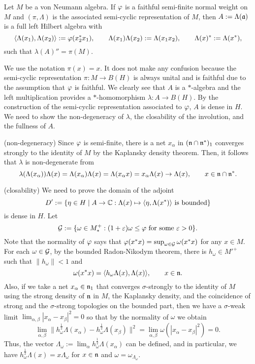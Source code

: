 \documentclass{../../small}
\begin{document}
\begin{thm}
Let $M$ be a von Neumann algebra.
If $\varphi$ is a faithful semi-finite normal weight on $M$ and $(\pi,\Lambda)$ is the associated semi-cyclic representation of $M$, then $A:=\Lambda(\mathfrak{a})$ is a full left Hilbert algebra with
\[\langle\Lambda(x_1),\Lambda(x_2)\rangle:=\varphi(x_2^*x_1),\qquad \Lambda(x_1)\Lambda(x_2):=\Lambda(x_1x_2),\qquad\Lambda(x)^*:=\Lambda(x^*),\]
such that $\lambda(A)''=\pi(M)$.
\end{thm}
\begin{pf}
We use the notation $\pi(x)=x$.
It does not make any confusion because the semi-cyclic representation $\pi:M\to B(H)$ is always unital and is faithful due to the assumption that $\varphi$ is faithful.
We clearly see that $A$ is a $*$-algebra and the left multiplication provides a $*$-homomorphism $\lambda:A\to B(H)$.
By the construction of the semi-cyclic representation associated to $\varphi$, $A$ is dense in $H$.
We need to show the non-degeneracy of $\lambda$, the closability of the involution, and the fullness of $A$.

(non-degeneracy)
Since $\varphi$ is semi-finite, there is a net $x_\alpha$ in $(\mathfrak{n}\cap\mathfrak{n}^*)_1$ converges strongly to the identity of $M$ by the Kaplansky density theorem.
Then, it follows that $\lambda$ is non-degenerate from
\[\lambda(\Lambda(x_\alpha))\Lambda(x)=\Lambda(x_\alpha)\Lambda(x)=\Lambda(x_\alpha x)=x_\alpha\Lambda(x)\to\Lambda(x),\qquad x\in\mathfrak{n}\cap\mathfrak{n}^*.\]

(closability)
We need to prove the domain of the adjoint
\[D':=\{\eta\in H\mid A\to\mathbb{C}:\Lambda(x)\mapsto\langle\eta,\Lambda(x^*)\rangle\text{ is bounded}\}\]
is dense in $H$.
Let
\[\mathcal{G}:=\{\omega\in M_*^+:(1+\varepsilon)\omega\le\varphi\text{ for some }\varepsilon>0\}.\]
Note that the normality of $\varphi$ says that $\varphi(x^*x)=\sup_{\omega\in\mathcal{G}}\omega(x^*x)$ for any $x\in M$.
For each $\omega\in\mathcal{G}$, by the bounded Radon-Nikodym theorem, there is $h_\omega\in M'^+$ such that $\|h_\omega\|<1$ and
\[\omega(x^*x)=\langle h_\omega\Lambda(x),\Lambda(x)\rangle,\qquad x\in\mathfrak{n}.\]
Also, if we take a net $x_\alpha\in\mathfrak{n}_1$ that converges $\sigma$-strongly to the identity of $M$ using the strong density of $\mathfrak{n}$ in $M$, the Kaplansky density, and the coincidence of strong and the $\sigma$-strong topologies on the bounded part, then we have a $\sigma$-weak limit $\lim_{\alpha,\beta}|x_\alpha-x_\beta|^2=0$ so that by the normality of $\omega$ we obtain
\[\lim_{\alpha,\beta}\|h_\omega^{\frac12}\Lambda(x_\alpha)-h_\omega^{\frac12}\Lambda(x_\beta)\|^2=\lim_{\alpha,\beta}\omega(|x_\alpha-x_\beta|^2)=0.\]
Thus, the vector $\Lambda_\omega:=\lim_\alpha h_\omega^{\frac12}\Lambda(x_\alpha)$ can be defined, and in particular, we have $h_\omega^{\frac12}\Lambda(x)=x\Lambda_\omega$ for $x\in\mathfrak{n}$ and $\omega=\omega_{\Lambda_\omega}$.


\end{pf}
\end{document}
